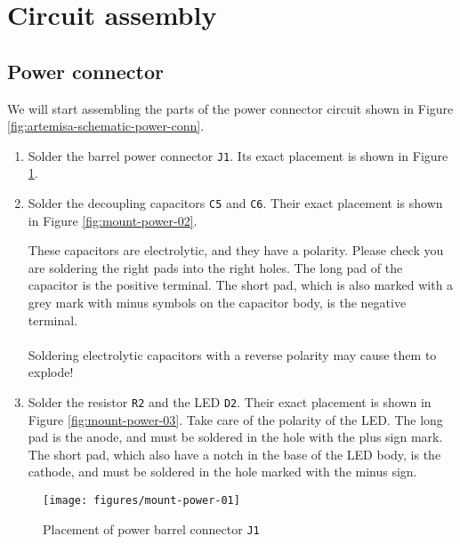 \section{Circuit assembly}

\subsection{Power connector}

We will start assembling the parts of the power connector circuit shown in Figure \ref{fig:artemisa-schematic-power-conn}.

\begin{enumerate}
  \item Solder the barrel power connector {\tt J1}. Its exact placement is shown in Figure \ref{fig:mount-power-01}.
  \item Solder the decoupling capacitors {\tt C5} and {\tt C6}. Their exact placement is shown in Figure \ref{fig:mount-power-02}.

        \begin{warning}
          These capacitors are electrolytic, and they have a polarity. Please check you are soldering the right pads into the right holes. The long pad of the capacitor is the positive terminal. The short pad, which is also marked with a grey mark with minus symbols on the capacitor body, is the negative terminal.\\\\

          Soldering electrolytic capacitors with a reverse polarity may cause them to explode!
        \end{warning}
  \item Solder the resistor {\tt R2} and the LED {\tt D2}. Their exact placement is shown in Figure \ref{fig:mount-power-03}. Take care of the polarity of the LED. The long pad is the anode, and must be soldered in the hole with the plus sign mark. The short pad, which also have a notch in the base of the LED body, is the cathode, and must be soldered in the hole marked with the minus sign.
\end{enumerate}

\begin{figure}[htbp]
  \centering
  \texttt{[image: figures/mount-power-01]}
  \caption{Placement of power barrel connector {\tt J1}}
  \label{fig:mount-power-01}
\end{figure}

